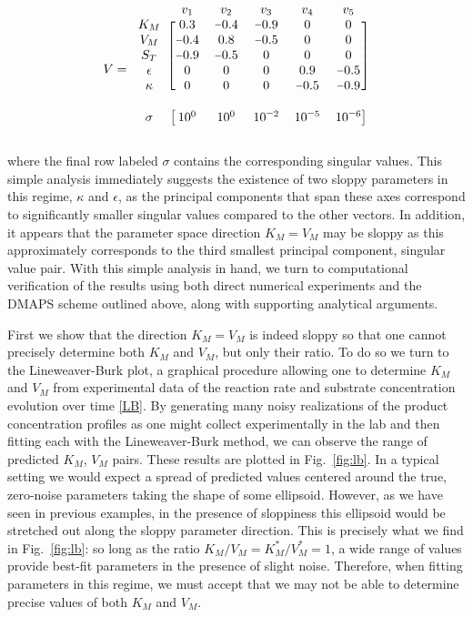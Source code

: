 \[
  V = \begin{blockarray}{cccccc} & v_1 & v_2 & v_3 & v_4 & v_5
    \\ \begin{block}{c[ccccc]} K_M & 0.3 & \minus 0.4 & \minus 0.9 & 0
      & 0 \\ V_M & \minus 0.4 & 0.8 & \minus 0.5 & 0 & 0 \\ S_T &
      \minus 0.9 & \minus 0.5 & 0 & 0 & 0 \\ \epsilon & 0 & 0 & 0 &
      0.9 & \minus 0.5 \\ \kappa & 0 & 0 & 0 & \minus 0.5 & \minus 0.9
      \\ \end{block} & & & & & \\ \begin{block}{c[ccccc]} \sigma &
      10^0 & 10^0 & 10^{\minus 2} & 10^{\minus 5} & 10^{\minus 6}
      \\ \end{block} \end{blockarray}
\]

where the final row labeled $\sigma$ contains the corresponding
singular values. This simple analysis immediately suggests the
existence of two sloppy parameters in this regime, $\kappa$ and
$\epsilon$, as the principal components that span these axes
correspond to significantly smaller singular values compared to the
other vectors. In addition, it appears that the parameter space
direction $K_M = V_M$ may be sloppy as this approximately corresponds
to the third smallest principal component, singular value pair. With
this simple analysis in hand, we turn to computational verification of
the results using both direct numerical experiments and the DMAPS
scheme outlined above, along with supporting analytical arguments.

First we show that the direction $K_M = V_M$ is indeed sloppy so that
one cannot precisely determine both $K_M$ and $V_M$, but only their
ratio. To do so we turn to the Lineweaver-Burk plot, a graphical
procedure allowing one to determine $K_M$ and $V_M$ from experimental
data of the reaction rate and substrate concentration evolution over
time \ref{LB}. By generating many noisy realizations of the product
concentration profiles as one might collect experimentally in the lab
and then fitting each with the Lineweaver-Burk method, we can observe
the range of predicted $K_M$, $V_M$ pairs. These results are plotted
in Fig.~\ref{fig:lb}. In a typical setting we would expect a spread of
predicted values centered around the true, zero-noise parameters
taking the shape of some ellipsoid. However, as we have seen in
previous examples, in the presence of sloppiness this ellipsoid would
be stretched out along the sloppy parameter direction. This is
precisely what we find in Fig.~\ref{fig:lb}: so long as the ratio
$K_M/V_M = K_M^*/V_M^* = 1$, a wide range of values provide best-fit
parameters in the presence of slight noise. Therefore, when fitting
parameters in this regime, we must accept that we may not be able to
determine precise values of both $K_M$ and $V_M$.


